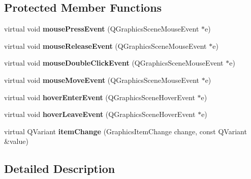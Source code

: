 \subsection*{Protected Member Functions}
\begin{DoxyCompactItemize}
\item 
\hypertarget{class_abstract_item_ad673bff88a3a88a6724c7cda3f3b7c3d}{virtual void {\bfseries mouse\-Press\-Event} (Q\-Graphics\-Scene\-Mouse\-Event $\ast$e)}\label{class_abstract_item_ad673bff88a3a88a6724c7cda3f3b7c3d}

\item 
\hypertarget{class_abstract_item_a8033d74fc51214e5ae8ac781b0046734}{virtual void {\bfseries mouse\-Release\-Event} (Q\-Graphics\-Scene\-Mouse\-Event $\ast$e)}\label{class_abstract_item_a8033d74fc51214e5ae8ac781b0046734}

\item 
\hypertarget{class_abstract_item_afbb05fefbb42d150a288891444639a2e}{virtual void {\bfseries mouse\-Double\-Click\-Event} (Q\-Graphics\-Scene\-Mouse\-Event $\ast$e)}\label{class_abstract_item_afbb05fefbb42d150a288891444639a2e}

\item 
\hypertarget{class_abstract_item_a8856a3eefe617e2cb4f48bb6a8f4bbc9}{virtual void {\bfseries mouse\-Move\-Event} (Q\-Graphics\-Scene\-Mouse\-Event $\ast$e)}\label{class_abstract_item_a8856a3eefe617e2cb4f48bb6a8f4bbc9}

\item 
\hypertarget{class_abstract_item_a2ce0bbbaf81fb0739305c896ac3960c1}{virtual void {\bfseries hover\-Enter\-Event} (Q\-Graphics\-Scene\-Hover\-Event $\ast$e)}\label{class_abstract_item_a2ce0bbbaf81fb0739305c896ac3960c1}

\item 
\hypertarget{class_abstract_item_a192e3d399162ac00f446339ae8f4d7d5}{virtual void {\bfseries hover\-Leave\-Event} (Q\-Graphics\-Scene\-Hover\-Event $\ast$e)}\label{class_abstract_item_a192e3d399162ac00f446339ae8f4d7d5}

\item 
\hypertarget{class_abstract_item_a1aa33003f3672f18172aeaea43fc21e9}{virtual Q\-Variant {\bfseries item\-Change} (Graphics\-Item\-Change change, const Q\-Variant \&value)}\label{class_abstract_item_a1aa33003f3672f18172aeaea43fc21e9}

\end{DoxyCompactItemize}


\subsection{Detailed Description}


